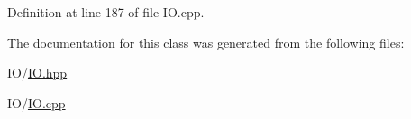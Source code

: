 Definition at line 187 of file I\-O.\-cpp.



The documentation for this class was generated from the following files\-:\begin{DoxyCompactItemize}
\item 
I\-O/\hyperlink{_i_o_8hpp}{I\-O.\-hpp}\item 
I\-O/\hyperlink{_i_o_8cpp}{I\-O.\-cpp}\end{DoxyCompactItemize}
